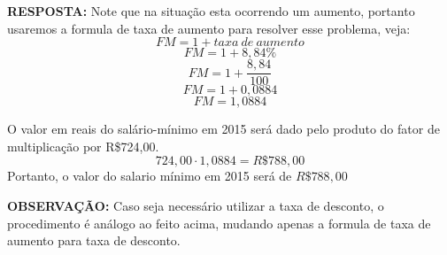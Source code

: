 \noindent \textbf{RESPOSTA:} Note que na situação esta ocorrendo um aumento, portanto usaremos a formula de taxa de aumento para resolver esse problema, veja:
$$FM=1+taxa~de~aumento$$
$$FM=1+8,84\%$$
$$FM=1+\frac{8,84}{100}$$
$$FM=1+0,0884$$
$$FM=1,0884$$

O valor em reais do salário-mínimo em 2015 será dado pelo produto do fator de multiplicação por R\$724,00.
$$ 724,00 \cdot 1,0884 = R\$ 788,00$$
Portanto, o valor do salario mínimo em 2015 será de $R\$788,00$

{\textbf{OBSERVAÇÃO:} Caso seja necessário utilizar a taxa de desconto, o procedimento é análogo ao feito acima, mudando apenas a formula de taxa de aumento para taxa de desconto.}
	



